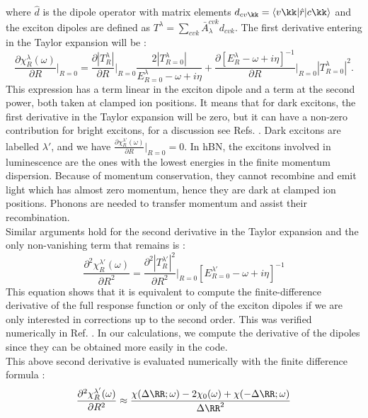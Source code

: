 where $\hat{d}$ is the dipole operator with matrix elements $d_{cv\kk} = \langle v \kk | \hat r | c\kk \rangle$ and the exciton dipoles are defined as $T^\lambda = \sum_{cvk} \bar{A}_\lambda^{cvk} d_{cvk}$. The first derivative entering in the Taylor expansion will be :
\begin{equation}
	\frac{\partial \chi^\lambda_R(\omega)}{\partial R}\biggr|_{R=0} = \frac{\partial |T^\lambda_R|}{\partial R}\biggr|_{R=0} \frac{2|T^\lambda_{R=0}|}{E^\lambda_{R=0} - \omega + i\eta} + \frac{\partial \left[ E^\lambda_R - \omega + i\eta \right]^{-1}}{\partial R}\biggr|_{R=0} |T^\lambda_{R=0}|^2.
\end{equation}
This expression has a term linear in the exciton dipole and a term at the second power, both taken at clamped ion positions. It means that for dark excitons, the first derivative in the Taylor expansion will be zero, but it can have a non-zero contribution for bright excitons, for a discussion see Refs. \cite{zacharias2016one,zacharias2015stochastic}. Dark excitons are labelled $\lambda'$, and we have $\frac{\partial \chi^{\lambda'}_R(\omega)}{\partial R}\bigr|_{R=0} = 0$.
In \acrshort{hBN}, the excitons involved in luminescence are the ones with the lowest energies in the finite momentum dispersion. Because of momentum conservation, they cannot recombine and emit light which has almost zero momentum, hence they are dark at clamped ion positions. Phonons are needed to transfer momentum and assist their recombination. \\ 
Similar arguments hold for the second derivative in the Taylor expansion
and the only non-vanishing term that remains is :
\begin{equation}
	\frac{\partial^2 \chi^{\lambda'}_R(\omega)}{\partial R^2} = \frac{\partial^2 |T^{\lambda'}_R|^2}{\partial R^2}\biggr|_{R=0} \left[ E^{\lambda'}_{R=0} - \omega + i\eta \right]^{-1} \label{eq:chi_fdd}
\end{equation}
This equation shows that it is equivalent to compute the finite-difference derivative of the full response function or only of the exciton dipoles if we are only interested in corrections up to the second order. This was verified numerically in Ref. \cite{paleari2019exciton}. In our calculations, we compute the derivative of the dipoles since they can be obtained more easily in the code. \\
This above second derivative is evaluated numerically with the finite difference formula :
\begin{equation}
	\frac{\partial^2 \chi^{\lambda'}_R(\omega)}{\partial R^2} \approx \frac{\chi(\Delta\RR;\omega) - 2 \chi_0(\omega) + \chi(-\Delta\RR;\omega)}{\Delta\RR^2}
\end{equation}

